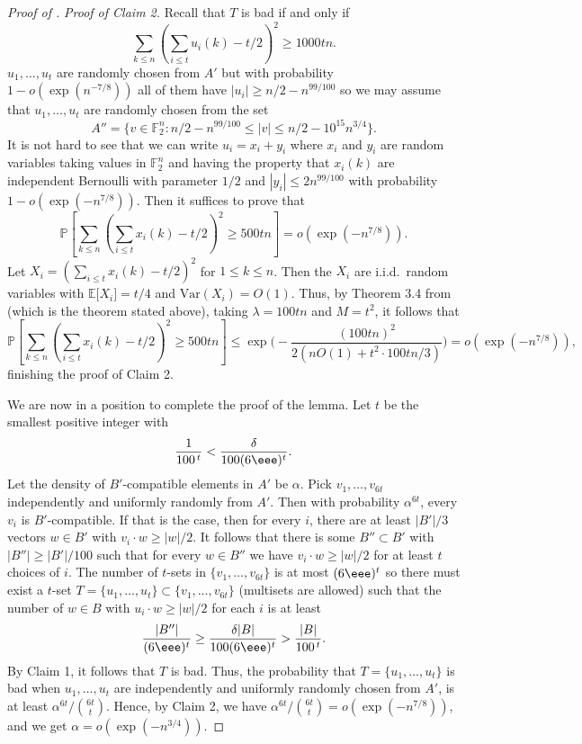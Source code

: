 \documentclass{toc}
\newcommand\E{\mathbb{E}}
\renewcommand\P{\mathbb{P}}
\newcommand\F{\mathbb{F}}
\renewcommand\a{\alpha}
\renewcommand\d{\delta}
\begin{document}
\begin{proof}[Proof of ]
	\noindent \emph{Proof of Claim 2.} Recall that $T$ is bad if and only if
        \[
          \sum_{k\leq n}\left(\sum_{i\leq t}u_i(k)-t/2\right)^2\geq 1000tn.
        \]
        $u_1,\dots,u_t$ are randomly chosen from $A'$ but with
        probability $1-o(\exp(n^{-7/8}))$ all of them have
        $|u_i|\geq n/2-n^{99/100}$ so we may assume that
        $u_1,\dots,u_t$ are randomly chosen from the set
        \[
          A''=\{v\in \F_2^n: n/2-n^{99/100}\leq |v|\leq
          n/2-10^{15}n^{3/4}\}.
        \]
        It is not hard to see that we can write
        $u_i=x_i+y_i$ where $x_i$ and $y_i$ are random variables
        taking values in $\F_2^{n}$ and having the property that
        $x_i(k)$ are independent Bernoulli with parameter $1/2$ and
        $|y_i|\leq 2n^{99/100}$ with probability
        $1-o(\exp(-n^{7/8}))$. Then it suffices to prove
        that
        \[
          \P\left\lbrack\sum_{k\leq n}\left(\sum_{i\leq t}x_i(k)-t/2\right)^2\geq
          500tn\right\rbrack=o(\exp(-n^{7/8})).
        \]
        Let
        $X_i=(\sum_{i\leq t} x_i(k)-t/2)^2$ for $1\leq k\leq n$. Then
        the $X_i$ are i.i.d.\ random variables with
        $\E \lbrack X_i\rbrack=t/4$ and $\text{Var}(X_i)=O(1)$. Thus,
        by Theorem 3.4 from \cite{chunglu} (which is the theorem
        stated above), taking $\lambda=100tn$ and $M=t^2$, it follows
        that
        \[
          \P\left\lbrack\sum_{k\leq n}\left(\sum_{i\leq t}x_i(k)-t/2\right)^2\geq
        500tn\right\rbrack\leq
        \exp\bigg(-\frac{(100tn)^2}{2(nO(1)+t^2\cdot100tn/3)}\bigg)=
        o(\exp(-n^{7/8})),
      \]
      finishing the proof of Claim 2.
	
	\smallskip
	
	We are now in a position to complete the proof of the lemma. Let $t$ be the
        smallest positive integer with
        \[
          \frac{1}{100^{\,t}}<\frac{\d}{100(6\eee)^t}.
        \]
        Let the density of $B'$-compatible elements in $A'$ be $\alpha$. Pick $v_1,\dots,v_{6t}$ independently and uniformly randomly from $A'$. Then with probability $\alpha^{6t}$, every $v_i$ is $B'$-compatible. If that is the case, then for every $i$, there are at least $|B'|/3$ vectors $w\in B'$ with $v_i\cdot w\geq |w|/2$. It follows that there is some $B''\subset B'$ with $|B''|\geq |B'|/100$ such that for every $w\in B''$ we have $v_i\cdot w\geq |w|/2$ for at least $t$ choices of $i$. The number of $t$-sets in $\{v_1,\dots,v_{6t}\}$ is at most $(6\eee)^{t}$ so there must exist a $t$-set $T=\{u_1,\dots,u_t\}\subset \{v_1,\dots,v_{6t}\}$ (multisets are allowed) such that the number of $w\in B$ with $u_i\cdot w\geq |w|/2$ for each $i$ is at least
  \[
   \frac{|B''|}{(6\eee)^{t}} \geq\frac{\delta|B|}{100(6\eee)^{t}}> \frac{|B|}{100^{\,t}}.
  \]
        By Claim 1, it follows that $T$ is bad. Thus, the probability that $T=\{u_1,\dots,u_t\}$ is bad when $u_1,\dots,u_t$ are independently and uniformly randomly chosen from $A'$, is at least ${\a^{6t}}/{\binom{6t}{t}}$. Hence, by Claim 2, we have ${\a^{6t}}/{\binom{6t}{t}}=o(\exp(-n^{7/8}))$, and we get $\alpha=o(\exp(-n^{3/4}))$.
\end{proof}
\end{document}

